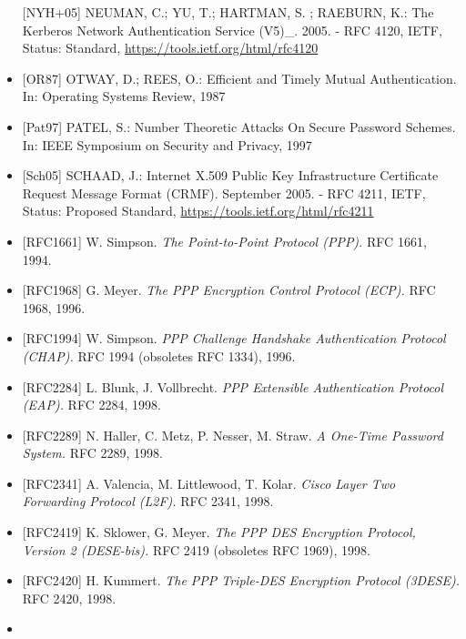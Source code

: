 \documentclass[a4paper]{article}
\begin{document}
\begin{multicols}{3}
\begin{itemize}
              {[}NYH+05{]} NEUMAN, C.; YU, T.; HARTMAN, S. ; RAEBURN, K.: The
              Kerberos Network Authentication Service (V5)\_. 2005. - RFC 4120,
              IETF, Status: Standard,
              \href{https://tools.ietf.org/html/rfc4120}{https://tools.ietf.org/html/rfc4120}
        \item
              {[}OR87{]} OTWAY, D.; REES, O.: Efficient and Timely Mutual
              Authentication. In: Operating Systems Review, 1987
        \item
              {[}Pat97{]} PATEL, S.: Number Theoretic Attacks On Secure Password
              Schemes. In: IEEE Symposium on Security and Privacy, 1997
        \item
              {[}Sch05{]} SCHAAD, J.: Internet X.509 Public Key Infrastructure
              Certificate Request Message Format (CRMF). September 2005. - RFC 4211,
              IETF, Status: Proposed Standard,
              \href{https://tools.ietf.org/html/rfc4211}{https://tools.ietf.org/html/rfc4211}
        \item
              {[}RFC1661{]} W. Simpson. \emph{The Point-to-Point Protocol (PPP).}
              RFC 1661, 1994.
        \item
              {[}RFC1968{]} G. Meyer. \emph{The PPP Encryption Control Protocol
                  (ECP).} RFC 1968, 1996.
        \item
              {[}RFC1994{]} W. Simpson. \emph{PPP Challenge Handshake Authentication
                  Protocol (CHAP).} RFC 1994 (obsoletes RFC 1334), 1996.
        \item
              {[}RFC2284{]} L. Blunk, J. Vollbrecht. \emph{PPP Extensible
                  Authentication Protocol (EAP).} RFC 2284, 1998.
        \item
              {[}RFC2289{]} N. Haller, C. Metz, P. Nesser, M. Straw. \emph{A
                  One-Time Password System.} RFC 2289, 1998.
        \item
              {[}RFC2341{]} A. Valencia, M. Littlewood, T. Kolar. \emph{Cisco Layer
                  Two Forwarding Protocol (L2F).} RFC 2341, 1998.
        \item
              {[}RFC2419{]} K. Sklower, G. Meyer. \emph{The PPP DES Encryption
                  Protocol, Version 2 (DESE-bis).} RFC 2419 (obsoletes RFC 1969), 1998.
        \item
              {[}RFC2420{]} H. Kummert. \emph{The PPP Triple-DES Encryption Protocol
                  (3DESE).} RFC 2420, 1998.
        \item

\end{itemize}
\end{multicols}
\end{document}
